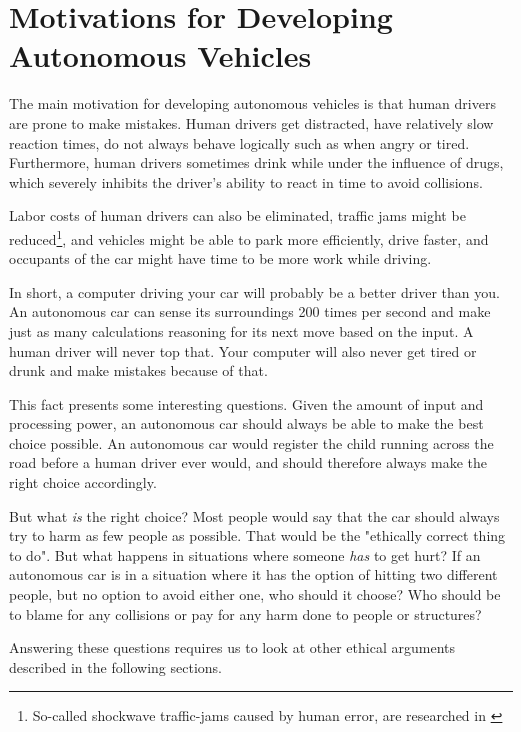 \section{Motivations for Developing Autonomous Vehicles}
The main motivation for developing autonomous vehicles is that human drivers are prone to make mistakes. Human drivers get distracted, have relatively slow reaction times, do not always behave logically such as when angry or tired. Furthermore, human drivers sometimes drink while under the influence of drugs, which severely inhibits the driver's ability to react in time to avoid collisions. 

Labor costs of human drivers can also be eliminated, traffic jams might be reduced\footnote{So-called shockwave traffic-jams caused by human error, are researched in \cite{1367-2630-10-3-033001}}, and vehicles might be able to park more efficiently, drive faster, and occupants of the car might have time to be more work while driving. 

\newpar In short, a computer driving your car will probably be a better driver than you. An autonomous car can sense its surroundings 200 times per second and make just as many calculations reasoning for its next move based on the input. A human driver will never top that. Your computer will also never get tired or drunk and make mistakes because of that. 

This fact presents some interesting questions. Given the amount of input and processing power, an autonomous car should always be able to make the best choice possible. An autonomous car would register the child running across the road before a human driver ever would, and should therefore always make the right choice accordingly. 

\newpar But what \textit{is} the right choice? Most people would say that the car should always try to harm as few people as possible. That would be the "ethically correct thing to do". But what happens in situations where someone \textit{has} to get hurt? If an autonomous car is in a situation where it has the option of hitting two different people, but no option to avoid either one, who should it choose? Who should be to blame for any collisions or pay for any harm done to people or structures? 

Answering these questions requires us to look at other ethical arguments described in the following sections.   